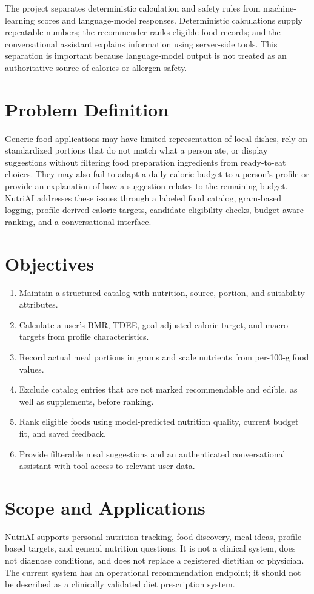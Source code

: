 \documentclass[12pt,a4paper]{report}
\begin{document}
The project separates deterministic calculation and safety rules from machine-learning
scores and language-model responses. Deterministic calculations supply repeatable
numbers; the recommender ranks eligible food records; and the conversational assistant
explains information using server-side tools. This separation is important because
language-model output is not treated as an authoritative source of calories or allergen
safety.

\section{Problem Definition}
Generic food applications may have limited representation of local dishes, rely on
standardized portions that do not match what a person ate, or display suggestions without
filtering food preparation ingredients from ready-to-eat choices. They may also fail to
adapt a daily calorie budget to a person's profile or provide an explanation of how a
suggestion relates to the remaining budget. NutriAI addresses these issues through a
labeled food catalog, gram-based logging, profile-derived calorie targets, candidate
eligibility checks, budget-aware ranking, and a conversational interface.

\section{Objectives}
\begin{enumerate}
  \item Maintain a structured catalog with nutrition, source, portion, and suitability
        attributes.
  \item Calculate a user's BMR, TDEE, goal-adjusted calorie target, and macro targets
        from profile characteristics.
  \item Record actual meal portions in grams and scale nutrients from per-100-g food
        values.
  \item Exclude catalog entries that are not marked recommendable and edible, as well
        as supplements, before ranking.
  \item Rank eligible foods using model-predicted nutrition quality, current budget fit,
        and saved feedback.
  \item Provide filterable meal suggestions and an authenticated conversational assistant
        with tool access to relevant user data.
\end{enumerate}

\section{Scope and Applications}
NutriAI supports personal nutrition tracking, food discovery, meal ideas, profile-based
targets, and general nutrition questions. It is not a clinical system, does not diagnose
conditions, and does not replace a registered dietitian or physician. The current system
has an operational recommendation endpoint; it should not be described as a clinically
validated diet prescription system.
\end{document}
